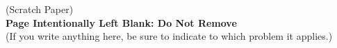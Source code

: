 \documentclass[letterpaper]{article}
\newcommand{\real}{\mathbb R}  %
\newcommand{\ds}{\displaystyle}
\newcommand{\spanof}[1]{\textrm{span} \{ #1 \}}
\begin{document}
%
%
%
%
%
%


\newpage



\begin{center}
(Scratch Paper)\\
{\bf \LARGE Page Intentionally Left Blank: Do Not Remove}\\
(If you write anything here, be sure to indicate to which problem it applies.)

\end{center}


\end{document}

